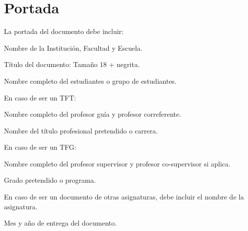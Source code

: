 \chapter{Portada}
La portada del documento debe incluir: 

Nombre de la Institución, Facultad y Escuela. 

Título del documento: Tamaño 18 + negrita. 

Nombre completo del estudiantes o grupo de estudiantes. 

En caso de ser un TFT: 

Nombre completo del profesor guía y profesor correferente. 

Nombre del título profesional pretendido o carrera. 

En caso de ser un TFG: 

Nombre completo del profesor supervisor y profesor co-supervisor si aplica. 

Grado pretendido o programa. 

En caso de ser un documento de otras asignaturas, debe incluir el nombre de la asignatura. 

Mes y año de entrega del documento. 
